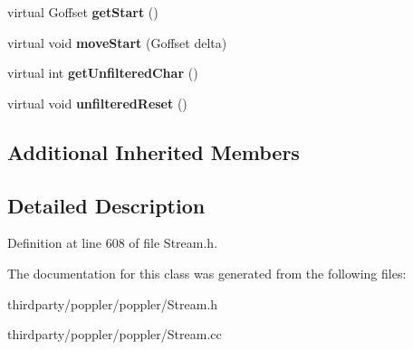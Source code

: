 \begin{DoxyCompactItemize}
\mbox{\label{class_embed_stream_a99a7fff7d2958007a6fd481d6cae3663}} 
virtual Goffset {\bfseries get\+Start} ()
\item 
\mbox{\label{class_embed_stream_a76eccef76276225edcb724f5cc5246af}} 
virtual void {\bfseries move\+Start} (Goffset delta)
\item 
\mbox{\label{class_embed_stream_a2d688f58da467236a7a26073363a36c8}} 
virtual int {\bfseries get\+Unfiltered\+Char} ()
\item 
\mbox{\label{class_embed_stream_a31e8164bcf6a4c974538235047c8d5f7}} 
virtual void {\bfseries unfiltered\+Reset} ()
\end{DoxyCompactItemize}
\subsection*{Additional Inherited Members}


\subsection{Detailed Description}


Definition at line 608 of file Stream.\+h.



The documentation for this class was generated from the following files\+:\begin{DoxyCompactItemize}
\item 
thirdparty/poppler/poppler/Stream.\+h\item 
thirdparty/poppler/poppler/Stream.\+cc\end{DoxyCompactItemize}
